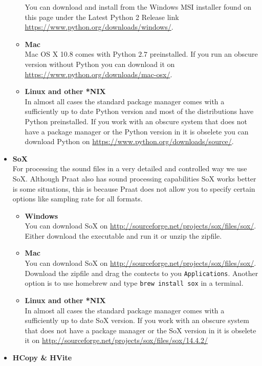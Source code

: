 \begin{itemize}
\begin{itemize}
				You can download and install from the Windows MSI installer found on
				this page under the Latest Python 2 Release link
				\url{https://www.python.org/downloads/windows/}.
			\item \textbf{Mac}\\
				Mac OS X 10.8 comes with Python $2.7$ preinstalled. If you run an
				obscure version without Python you can download it on 
				\url{https://www.python.org/downloads/mac-osx/}.
			\item \textbf{Linux and other *NIX}\\
				In almost all cases the standard package manager comes with a
				sufficiently up to date Python version and most of the distributions
				have Python preinstalled. If you work with an obscure system that does
				not have a package manager or the Python version in it is obselete you
				can download Python on \url{https://www.python.org/downloads/source/}.
		\end{itemize}
	\item \textbf{SoX}\\
		For processing the sound files in a very detailed and controlled way we
		use SoX. Although Praat also has sound processing capabilities SoX works
		better is some situations, this is because Praat does not allow you to
		specify certain options like sampling rate for all formats.
		\begin{itemize}
			\item \textbf{Windows}\\
				You can download SoX on
				\url{http://sourceforge.net/projects/sox/files/sox/}. Either download
				the executable and run it or unzip the zipfile.
			\item \textbf{Mac}\\
				You can download SoX on
				\url{http://sourceforge.net/projects/sox/files/sox/}. Download the
				zipfile and drag the contects to you \texttt{Applications}. Another
				option is to use homebrew and type \texttt{brew install sox} in a
				terminal.
			\item \textbf{Linux and other *NIX}\\
				In almost all cases the standard package manager comes with a
				sufficiently up to date SoX version. If you work with an obscure system
				that does not have a package manager or the SoX version in it is
				obselete it on 
				\url{http://sourceforge.net/projects/sox/files/sox/14.4.2/}
		\end{itemize}
	\item \textbf{HCopy \& HVite}\\

\end{itemize}
